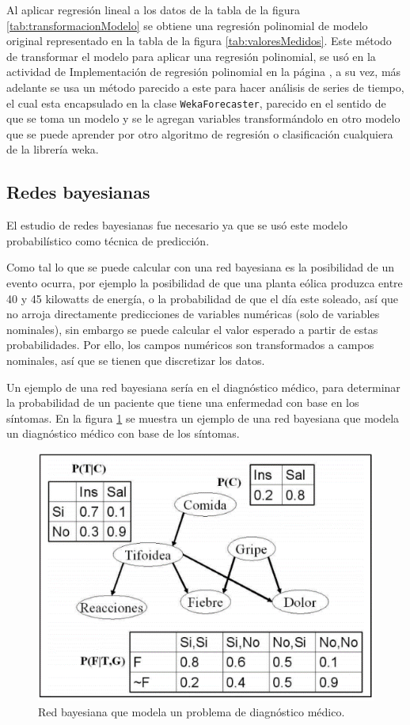 Al aplicar regresión lineal a los datos de la tabla de la figura \ref{tab:transformacionModelo} se obtiene una regresión
polinomial de modelo original representado en la tabla de la figura \ref{tab:valoresMedidos}. 
Este método de transformar el modelo para aplicar una regresión polinomial, se usó en la actividad de Implementación de regresión polinomial en la página \pageref{subsec:implementacionRegresionPolinomial}, a su vez, más adelante se usa un método parecido a este para hacer análisis de series de tiempo, el cual esta encapsulado en la clase \texttt{WekaForecaster}, parecido en el sentido de que se toma un modelo y se le agregan variables transformándolo en otro modelo que se puede aprender por otro algoritmo de regresión o clasificación cualquiera de la librería weka.

\subsection{Redes bayesianas} \label{subsec:redesbayesianas}
El estudio de redes bayesianas fue necesario ya que se usó este modelo probabilístico como técnica de predicción.

Como tal lo que se puede calcular con una red bayesiana es la posibilidad de un evento ocurra,
por ejemplo la posibilidad de que una planta eólica produzca entre 40 y 45 kilowatts de energía, o la probabilidad de que el día este soleado, así que no arroja directamente predicciones de variables numéricas (solo de variables nominales), sin embargo se puede calcular el valor esperado a partir de estas probabilidades. Por ello, los campos numéricos son transformados a campos nominales, así que se tienen que discretizar los datos.

Un ejemplo de una red bayesiana sería en el diagnóstico médico, para determinar la probabilidad de un paciente que tiene una enfermedad con base en los síntomas. En la figura \ref{fig:redBayesianaDiagnostico} se muestra un ejemplo de una red bayesiana que modela un diagnóstico médico con base de los síntomas.

\begin{figure}[h]
	\centering
	\includegraphics[width=13cm]{img/redBayesianaDiagnostico.png}
	\caption{Red bayesiana que modela un problema de diagnóstico médico.}
	\label{fig:redBayesianaDiagnostico}
\end{figure}

